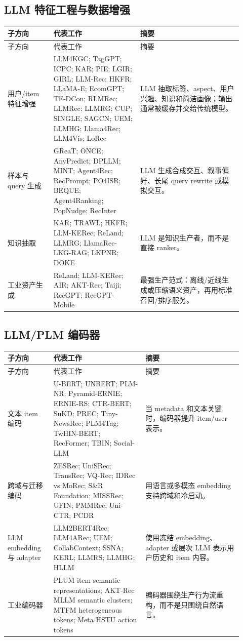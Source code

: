 \documentclass[UTF8,fontset=fandol,11pt]{ctexart}
\begin{document}
\subsection{LLM 特征工程与数据增强}

\small
\begin{longtable}{@{}p{0.18\linewidth}p{0.34\linewidth}p{0.40\linewidth}@{}}
\toprule
子方向 & 代表工作 & 摘要\\
\midrule
\endfirsthead
\toprule
子方向 & 代表工作 & 摘要\\
\midrule
\endhead
用户/item 特征增强 & LLM4KGC; TagGPT; ICPC; KAR; PIE; LGIR; GIRL; LLM-Rec; HKFR; LLaMA-E; EcomGPT; TF-DCon; RLMRec; LLMRec; LLMRG; CUP; SINGLE; SAGCN; UEM; LLMHG; Llama4Rec; LLM4Vis; LoRec & LLM 抽取标签、aspect、用户兴趣、知识和简洁画像；输出通常被缓存并交给传统模型。\\
样本与 query 生成 & GReaT; ONCE; AnyPredict; DPLLM; MINT; Agent4Rec; RecPrompt; PO4ISR; BEQUE; Agent4Ranking; PopNudge; RecInter & LLM 生成合成交互、叙事偏好、长尾 query rewrite 或模拟交互。\\
知识抽取 & KAR; TRAWL; HKFR; LLM-KERec; ReLand; LLMRG; LlamaRec-LKG-RAG; LKPNR; DOKE & LLM 是知识生产者，而不是直接 ranker。\\
工业资产生成 & ReLand; LLM-KERec; AIR; AKT-Rec; Taiji; RecGPT; RecGPT-Mobile & 最强生产范式：离线/近线生成或压缩语义资产，再用标准召回/排序服务。\\
\bottomrule
\end{longtable}
\normalsize

\subsection{LLM/PLM 编码器}

\small
\begin{longtable}{@{}p{0.18\linewidth}p{0.36\linewidth}p{0.38\linewidth}@{}}
\toprule
子方向 & 代表工作 & 摘要\\
\midrule
\endfirsthead
\toprule
子方向 & 代表工作 & 摘要\\
\midrule
\endhead
文本 item 编码 & U-BERT; UNBERT; PLM-NR; Pyramid-ERNIE; ERNIE-RS; CTR-BERT; SuKD; PREC; Tiny-NewsRec; PLM4Tag; TwHIN-BERT; RecFormer; TBIN; Social-LLM & 当 metadata 和文本关键时，编码器提升 item/user 表示。\\
跨域与迁移编码 & ZESRec; UniSRec; TransRec; VQ-Rec; IDRec vs MoRec; S\&R Foundation; MISSRec; UFIN; PMMRec; Uni-CTR; PCDR & 用语言或多模态 embedding 支持跨域和冷启动。\\
LLM embedding 与 adapter & LLM2BERT4Rec; LLM4ARec; UEM; CollabContext; SSNA; KERL; LLMRS; LLMHG; HLLM & 使用冻结 embedding、adapter 或层次 LLM 表示用户历史和 item 内容。\\
工业编码器 & PLUM item semantic representations; AKT-Rec MLLM semantic clusters; MTFM heterogeneous tokens; Meta HSTU action tokens & 编码器围绕生产行为流重构，而不是只围绕自然语言。\\
\bottomrule
\end{longtable}
\normalsize
\end{document}
